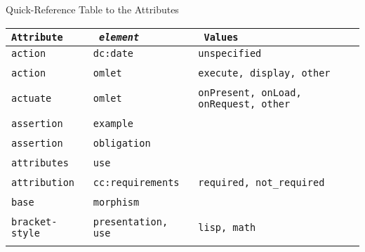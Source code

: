 
\begin{tchapter}[id=att-table,short=Table of Attributes]{Quick-Reference Table to the {\omdoc} Attributes}
\def\atabelt#1#2#3#4{\hline{}{#1}&{#2}&{#3}\\\hline&\multicolumn{2}{|p{9cm}|}{#4}\\\hline}
{\footnotesize\begin{longtable}{|>{\tt}p{2.5cm}|>{\tt}p{4cm}|>{\tt}p{5cm}|}\hline
{\rm Attribute} & {\emph{element}} & Values \\\hline
\atabelt{action}{dc:date}{unspecified}{specifies the action taken on the document on this date.}

\atabelt{action}{omlet}{execute, display, other}
 {specifies the action to be taken when executing the {\element{omlet}}, the value is
     application-defined.}

\atabelt{actuate}{omlet}{onPresent, onLoad, onRequest, other}{specifies the timing of the
  action specified in the {\attribute{action}{omlet}} attribute}

\atabelt{assertion}{example}{}
 {specifies the assertion that states that the objects given in the example really have
   the expected properties.}

\atabelt{assertion}{obligation}{}
 {specifies the assertion that states that the translation of the statement in the
  source theory specified by the {\attributeshort{induced-by}} attribute is valid in the
  target theory.}

\atabelt{attributes}{use}{}
 {the attribute string for the start tag of the {\xml} element  substituted for
 the brackets (this is specified in the {\element{element}} attribute).}
\atabelt{attribution}{cc:requirements}{required, not\_required}
{Specifies whether the copyright holder/author must be given credit in derivative works}

\atabelt{base}{morphism}{}
 {specifies another morphism that should be used as a base for expansion in the
  definition of this morphism}

\atabelt{bracket-style}{presentation, use}{lisp, math}
 {specifies whether a function application is of the form $f(a,b)$ or $(f a b)$}


\end{longtable}}
\end{tchapter}

